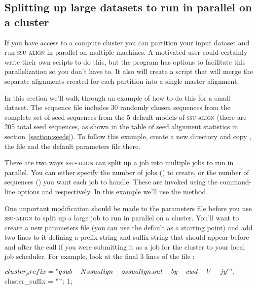 \subsection{Splitting up large datasets to run in parallel on a cluster}

If you have access to a compute cluster you can partition your input
dataset and run \textsc{ssu-align} in parallel on multiple machines. A
motivated user could certainly write their own scripts to do this, but
the  program has options to facilitate this
parallelization so you don't have to.  It also will create a script
that will merge the separate alignments created for each partition
into a single master alignment.

In this section we'll walk through an example of how to do this for a
small dataset.  The sequence file  includes
30 randomly chosen sequences from the complete set of seed sequences
from the 5 default models of \textsc{ssu-align} (there are 205 total
seed sequences, as shown in the table of seed alignment statistics in
section~\ref{section:seeds}). To follow this example, create a new
directory and copy , the file
 and the default parameters file
 there.

There are two ways \textsc{ssu-align} can split up a job into multiple
jobs to run in parallel. You can either specify the number of jobs
() to create, or the number of sequences () you
want each job to handle. These are invoked using the command-line
options  and  respectively.  In this example
we'll use the  method.

One important modification should be made to the parameters file
before you use \textsc{ssu-align} to split up a large job to run in
parallel on a cluster. You'll want to create a new parameters file
(you can use the default  as a starting point) and
add two lines to it defining a prefix string and suffix string that
should appear before and after the  call if you were
submitting it as a job for the cluster to your local job
scheduler. For example, look at the final 3 lines of the file
:

\begin{sreoutput}
$cluster_prefix = "qsub -N ssualign -o ssualign.out -b y -cwd -V -j y '";
$cluster_suffix = "'";
1;
\end{sreoutput}

